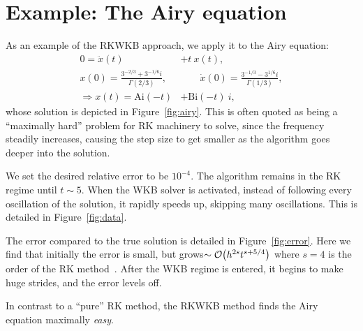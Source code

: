 \section{Example: The Airy equation}


As an example of the RKWKB approach, we apply it to the Airy equation:
\begin{align}
  0=\ddot{x}(t) &+ t\: x(t) ,
  \label{eqn:airy_equation}\\
  x(0)=\frac{3^{-2/3}+3^{-1/6}i}{\Gamma(2/3)},
  &\qquad
  \dot{x}(0) = \frac{3^{-1/3}-3^{1/6}i}{\Gamma(1/3)},
  \nonumber\\
  \Rightarrow x(t) = \mathrm{Ai}(-t) &+ \mathrm{Bi}(-t)\:i,
  \label{eqn:airy_solution}
\end{align}
whose solution is depicted in Figure~\ref{fig:airy}. This is often quoted as being a ``maximally hard'' problem for RK machinery to solve, since the frequency steadily increases, causing the step size to get smaller as the algorithm goes deeper into the solution.

We set the desired relative error to be $10^{-4}$. The algorithm remains in the RK regime until $t\sim5$. When the WKB solver is activated, instead of following every oscillation of the solution, it rapidly speeds up, skipping many oscillations. This is detailed in Figure~\ref{fig:data}.

The error compared to the true solution is detailed in Figure~\ref{fig:error}. Here we find that initially the error is small, but grows${\sim\mathcal{O}{\left(h^{2s} t^{s+5/4}\right)}}$ where $s=4$ is the order of the RK method~\citep{Iserles02globalerror}. After the WKB regime is entered, it begins to make huge strides, and the error levels off.

In contrast to a ``pure'' RK method, the RKWKB method finds the Airy equation maximally {\em easy}.



